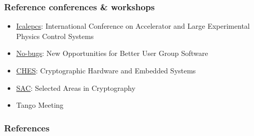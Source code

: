 \documentclass{beamer}
\begin{document}
\begin{frame}
\frametitle{Reference conferences \& workshops}
\begin{itemize}
    \item \href{http://www.icalepcs.org/}{Icalepcs}: International Conference on Accelerator and Large Experimental Physics Control Systems
    \item \href{http://www.nobugsconference.org/}{No-bugs}: New Opportunities for Better User Group Software
    \item \href{http://www.chesworkshop.org/}{CHES}: Cryptographic Hardware and Embedded Systems
    \item \href{http://www.sacconference.org/}{SAC}: Selected Areas in Cryptography
    \item Tango Meeting
\end{itemize}

\end{frame}

\begin{frame}[allowframebreaks]
        \frametitle{References}
        
        
\end{frame}
\end{document}
